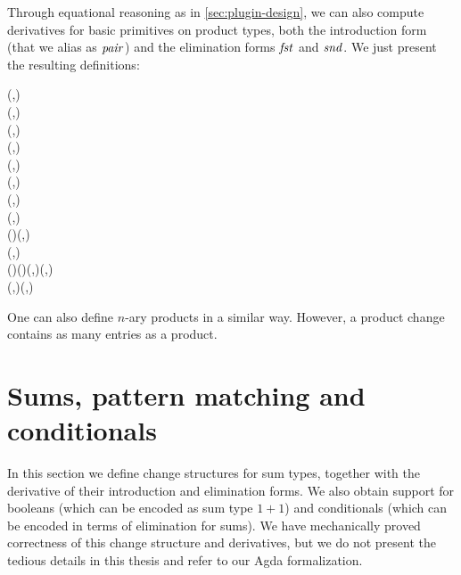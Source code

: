 Through equational reasoning as in \cref{sec:plugin-design}, we can also
compute derivatives for basic primitives on product types, both
the introduction form (that we alias as \ensuremath{\Varid{pair}}) and the elimination forms \ensuremath{\Varid{fst}}
and \ensuremath{\Varid{snd}}. We just present the resulting definitions:
\begin{hscode}\SaveRestoreHook
{}%
%
\>[B]{}\;\;\mathrel{=}(,){}\<[E]%
\\
\>[B]{}\;\;\;\;\mathrel{=}(,){}\<[E]%
\\[\blanklineskip]%
\>[B]{}\;(,)\mathrel{=}\<[E]%
\\
\>[B]{}\;(,)\mathrel{=}\<[E]%
\\
\>[B]{}\mathrel{:\mkern-1mu:}\Delta (,)\to \Delta {}\<[E]%
\\
\>[B]{}\;(,)\mathrel{=}\<[E]%
\\
\>[B]{}\mathrel{:\mkern-1mu:}\Delta (,)\to \Delta {}\<[E]%
\\
\>[B]{}\;(,)\mathrel{=}\<[E]%
\\[\blanklineskip]%
\>[B]{}\mathrel{:\mkern-1mu:}(\to {}\to {})\to (,)\to {}\<[E]%
\\
\>[B]{}\;\;(,)\mathrel{=}\;\;\<[E]%
\\
\>[B]{}\mathrel{:\mkern-1mu:}(\to {}\to {})\to \Delta (\to {}\to {})\to (,)\to \Delta (,)\to \Delta {}\<[E]%
\\
\>[B]{}\;\;\;(,)\;(,)\mathrel{=}\;\;\;\;\<[E]%
\ColumnHook
\end{hscode}\resethooks

One can also define $n$-ary products in a similar way. However, a product change
contains as many entries as a product.

\section{Sums, pattern matching and conditionals}
\label{sec:chs-sums}
In this section we define change structures for sum types, together with the
derivative of their introduction and elimination forms.
We also obtain support for booleans (which can be encoded as sum type \ensuremath{\mathrm{1}\mathbin{+}\mathrm{1}})
and conditionals (which can be encoded in terms of elimination for sums).
We have mechanically proved correctness of this change structure and
derivatives, but we do not present the tedious details in this thesis and refer
to our Agda formalization.

